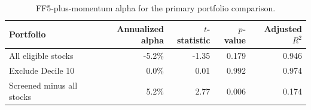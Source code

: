 \begin{table}[!htbp]
\centering
\footnotesize
\caption{FF5-plus-momentum alpha for the primary portfolio comparison.}
\label{tab:portfolio-alpha}
\begin{tabular}{lrrrr}
\toprule
Portfolio & Annualized alpha & $t$-statistic & $p$-value & Adjusted $R^2$ \\
\midrule
All eligible stocks & -5.2\% & -1.35 & 0.179 & 0.946 \\
Exclude Decile 10 & 0.0\% & 0.01 & 0.992 & 0.974 \\
Screened minus all stocks & 5.2\% & 2.77 & 0.006 & 0.174 \\
\bottomrule
\end{tabular}
\end{table}
